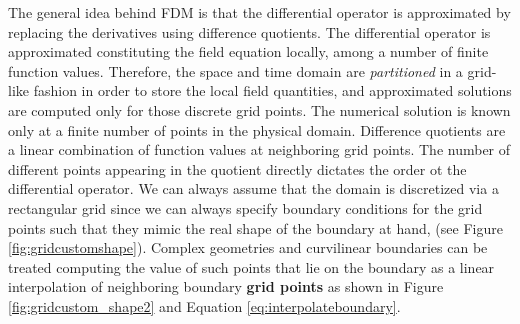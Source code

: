 The general idea behind FDM is that the differential operator is approximated by replacing the derivatives using difference quotients. The differential operator is approximated constituting the field equation locally, among a number of finite function values. Therefore, the space and time domain are \textit{partitioned} in a grid-like fashion in order to store the local field quantities, and approximated solutions are computed only for those discrete grid points. The numerical solution is known only at a finite number of points in the physical domain. 
Difference quotients are a linear combination of function values at neighboring grid points. The number of different points appearing in the quotient directly dictates the order ot the differential operator.
We can always assume that the domain is discretized via a rectangular grid since we can always specify boundary conditions for the grid points such that they mimic the real shape of the boundary at hand, (see Figure \ref{fig:gridcustomshape}).
Complex geometries and curvilinear boundaries can be treated computing the value of such points that lie on the boundary as a linear interpolation of neighboring boundary \textbf{grid points} as shown in Figure \ref{fig:gridcustom_shape2} and Equation \ref{eq:interpolateboundary}.

